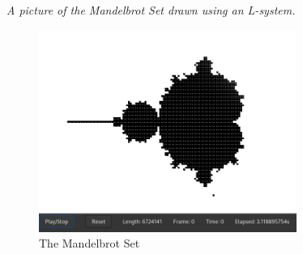 \documentclass[a4paper]{article}
\begin{document}
\begin{center}
    \thispagestyle{empty}
    \vspace*{\fill}
    \textsl{A picture of the Mandelbrot Set\cite{mandelbrot}
    drawn using an L-system.}
    \begin{figure}[h]
        \centering
        \includegraphics[width=0.75\textwidth]{media/gui/gui-mandelbrot.png}
        \caption{The Mandelbrot Set}
    \end{figure}
    \vspace*{\fill}
\end{center}

\pagebreak

\listoffigures

\pagebreak

\nocite{*} %

\printbibliography

\pagebreak

\printnoidxglossary
\end{document}
